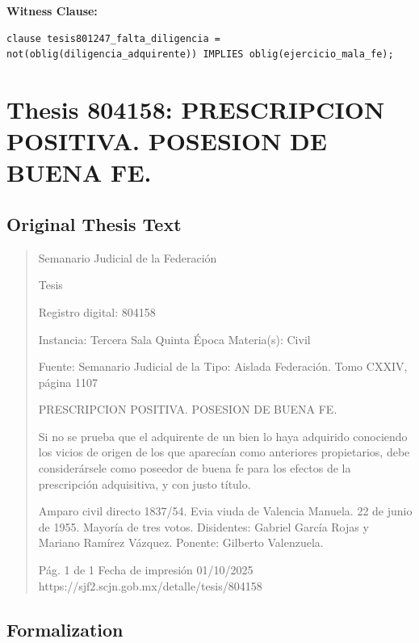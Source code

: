 \documentclass[11pt,a4paper]{article}
\begin{document}
\textbf{Witness Clause:}

\begin{lstlisting}[style=witnessstyle, language=Witness]
clause tesis801247_falta_diligencia = not(oblig(diligencia_adquirente)) IMPLIES oblig(ejercicio_mala_fe);
\end{lstlisting}

\newpage

\section{Thesis 804158: PRESCRIPCION POSITIVA. POSESION DE BUENA FE.}
\label{thesis:804158}

\subsection{Original Thesis Text}

\begin{quote}
                                                   Semanario Judicial de la Federación

                                                  Tesis

 Registro digital: 804158

 Instancia: Tercera Sala          Quinta Época                         Materia(s): Civil

                                  Fuente: Semanario Judicial de la     Tipo: Aislada
                                  Federación.
                                  Tomo CXXIV, página 1107


PRESCRIPCION POSITIVA. POSESION DE BUENA FE.


Si no se prueba que el adquirente de un bien lo haya adquirido conociendo los vicios de origen de
los que aparecían como anteriores propietarios, debe considerársele como poseedor de buena fe
para los efectos de la prescripción adquisitiva, y con justo título.


Amparo civil directo 1837/54. Evia viuda de Valencia Manuela. 22 de junio de 1955. Mayoría de tres
votos. Disidentes: Gabriel García Rojas y Mariano Ramírez Vázquez. Ponente: Gilberto Valenzuela.




                                             Pág. 1 de 1             Fecha de impresión 01/10/2025
  https://sjf2.scjn.gob.mx/detalle/tesis/804158

\end{quote}

\subsection{Formalization}
\end{document}
